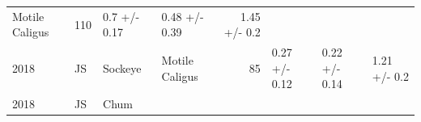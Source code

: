 \documentclass[fleqn,10pt]{wlpeerj} %
\begin{document}
\begin{longtable}[]{@{}llllrlll@{}}
\begin{minipage}[t]{0.11\columnwidth}
Motile Caligus\strut
\end{minipage} & \begin{minipage}[t]{0.04\columnwidth}\raggedleft\strut
110\strut
\end{minipage} & \begin{minipage}[t]{0.14\columnwidth}\raggedright\strut
0.7 +/- 0.17\strut
\end{minipage} & \begin{minipage}[t]{0.14\columnwidth}\raggedright\strut
0.48 +/- 0.39\strut
\end{minipage} & \begin{minipage}[t]{0.14\columnwidth}\raggedright\strut
1.45 +/- 0.2\strut
\end{minipage}\tabularnewline
\begin{minipage}[t]{0.09\columnwidth}\raggedright\strut
2018\strut
\end{minipage} & \begin{minipage}[t]{0.06\columnwidth}\raggedright\strut
JS\strut
\end{minipage} & \begin{minipage}[t]{0.06\columnwidth}\raggedright\strut
Sockeye\strut
\end{minipage} & \begin{minipage}[t]{0.11\columnwidth}\raggedright\strut
Motile Caligus\strut
\end{minipage} & \begin{minipage}[t]{0.04\columnwidth}\raggedleft\strut
85\strut
\end{minipage} & \begin{minipage}[t]{0.14\columnwidth}\raggedright\strut
0.27 +/- 0.12\strut
\end{minipage} & \begin{minipage}[t]{0.14\columnwidth}\raggedright\strut
0.22 +/- 0.14\strut
\end{minipage} & \begin{minipage}[t]{0.14\columnwidth}\raggedright\strut
1.21 +/- 0.2\strut
\end{minipage}\tabularnewline
\begin{minipage}[t]{0.09\columnwidth}\raggedright\strut
2018\strut
\end{minipage} & \begin{minipage}[t]{0.06\columnwidth}\raggedright\strut
JS\strut
\end{minipage} & \begin{minipage}[t]{0.06\columnwidth}\raggedright\strut
Chum\strut
\end{minipage} & \begin{minipage}[t]{0.11\columnwidth}\raggedright\strut

\end{minipage}
\end{longtable}
\end{document}
